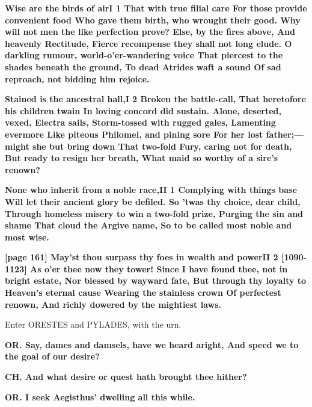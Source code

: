 \documentclass[11pt,letter]{book}
\begin{document}
\par \textbf{Wise are the birds of airI 1 That with true filial care For those provide convenient food Who gave them birth, who wrought their good. Why will not men the like perfection prove? Else, by the fires above, And heavenly Rectitude, Fierce recompense they shall not long elude. O darkling rumour, world-o’er-wandering voice That piercest to the shades beneath the ground, To dead Atrides waft a sound Of sad reproach, not bidding him rejoice.}
\par 

\par \textbf{Stained is the ancestral hall,I 2 Broken the battle-call, That heretofore his children twain In loving concord did sustain. Alone, deserted, vexed, Electra sails, Storm-tossed with rugged gales, Lamenting evermore Like piteous Philomel, and pining sore For her lost father;—might she but bring down That two-fold Fury, caring not for death, But ready to resign her breath, What maid so worthy of a sire’s renown?}
\par 

\par \textbf{None who inherit from a noble race,II 1 Complying with things base Will let their ancient glory be defiled. So ’twas thy choice, dear child, Through homeless misery to win a two-fold prize, Purging the sin and shame That cloud the Argive name, So to be called most noble and most wise.}
\par 

\par \textbf{[page 161] May’st thou surpass thy foes in wealth and powerII 2 [1090-1123] As o’er thee now they tower! Since I have found thee, not in bright estate, Nor blessed by wayward fate, But through thy loyalty to Heaven’s eternal cause Wearing the stainless crown Of perfectest renown, And richly dowered by the mightiest laws.}
\par 

\par  Enter ORESTES and PYLADES, with the urn.

\par \textbf{OR. Say, dames and damsels, have we heard aright, And speed we to the goal of our desire?}
\par 

\par \textbf{CH. And what desire or quest hath brought thee hither?}
\par 

\par \textbf{OR. I seek Aegisthus’ dwelling all this while.}
\par 
\end{document}
